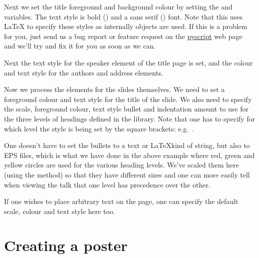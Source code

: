Next we set the title foreground and background colour by setting the
 and  variables.  The text style is bold
(\ttt{\\bf}) and a sans serif (\ttt{\\sf}) font.  Note that this uses
\LaTeX{} to specify these styles as internally \pyscript {} objects
are used.  If this is a problem for you, just send us a bug report or
feature request on the \href{http://pyscript.sf.net}{pyscript} web page and
we'll try and fix it for you as soon as we can.

Next the text style for the speaker element of the title page is set, and
the colour and text style for the authors and address elements.

Now we process the elements for the slides themselves.  We need to set a
foreground colour and text style for the title of the slide.  We also need
to specify the scale, foreground colour, text style bullet and indentation
amount to use for the three levels of headings defined in the
 library.  Note that one has to specify for which level
the style is being set by the square brackets: e.g.~.  

One doesn't have to set the bullets to a text or \LaTeX kind of string, but
also to EPS files, which is what we have done in the above example where
red, green and yellow circles are used for the various heading levels.
We've scaled them here (using the \pyscript {} method) so that they
have different sizes and one can more easily tell when viewing the talk that
one level has precedence over the other.

If one wishes to place arbitrary text on the page, one can specify the
default scale, colour and text style here too.

\section{Creating a poster}

